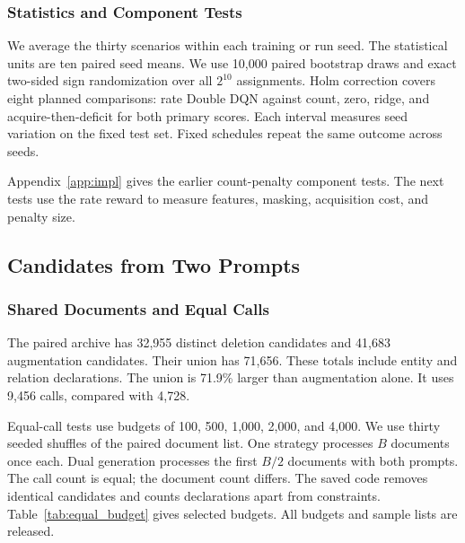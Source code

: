 \subsubsection{Statistics and Component Tests}

We average the thirty scenarios within each training or run seed.
The statistical units are ten paired seed means. We use 10,000 paired
bootstrap draws and exact two-sided sign randomization over all $2^{10}$
assignments. Holm correction covers eight planned comparisons:
rate Double DQN against count, zero, ridge, and acquire-then-deficit
for both primary scores. Each interval measures seed variation on
the fixed test set. Fixed schedules repeat the same outcome across seeds.

Appendix~\ref{app:impl} gives the earlier count-penalty component tests.
The next tests use the rate reward to measure features, masking,
acquisition cost, and penalty size.





\subsection{Candidates from Two Prompts}

\label{subsubsec:dual_strategy_ablation}

\subsubsection{Shared Documents and Equal Calls}

The paired archive has 32,955 distinct deletion candidates and 41,683
augmentation candidates. Their union has 71,656. These totals include
entity and relation declarations. The union is 71.9\% larger than
augmentation alone. It uses 9,456 calls, compared with 4,728.

Equal-call tests use budgets of 100, 500, 1,000, 2,000, and 4,000.
We use thirty seeded shuffles of the paired document list.
One strategy processes $B$ documents once each. Dual generation processes
the first $B/2$ documents with both prompts. The call count is equal;
the document count differs. The saved code removes identical candidates
and counts declarations apart from constraints.
Table~\ref{tab:equal_budget} gives selected budgets.
All budgets and sample lists are released.



